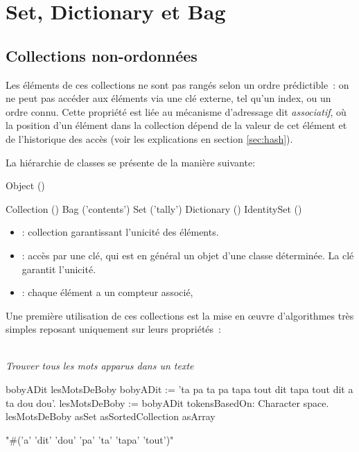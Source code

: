 \ifx\wholebook\relax\else


\fi

\chapter{Set, Dictionary et Bag}


\section{Collections non-ordonn\'ees}





Les \'el\'ements de ces collections ne sont pas rang\'es selon un
ordre pr\'edictible~:  on ne peut pas acc\'eder aux \'el\'ements
via une cl\'e externe, tel qu'un index, ou un ordre connu. 
Cette propri\'et\'e est li\'ee au m\'ecanisme
d'adressage dit {\sl associatif}, o\`u la position d'un \'el\'ement
dans la collection d\'epend de la valeur de cet \'el\'ement
et de l'historique des acc\`es
(voir les explications en section \ref{sec:hash}).

La hi\'erarchie de classes se pr\'esente de la mani\`ere suivante:

\begin{scode}
Object ()

    Collection ()
        Bag ('contents')
        Set ('tally')
            Dictionary ()
            IdentitySet ()

\end{scode}

\begin{itemize}
\item {} : collection garantissant l'unicit\'e des \'el\'ements.
\item {} : acc\`es par une cl\'e, 
qui est en g\'en\'eral un objet d'une classe d\'etermin\'ee.
La cl\'e garantit l'unicit\'e.
\item {} : chaque  \'el\'ement a un compteur associ\'e,
\end{itemize}

Une premi\`ere utilisation de ces collections est la 
mise en {\oe}uvre d'algorithmes tr\`es simples reposant uniquement sur leurs
propri\'et\'es~:
 
 ~\\{\em Trouver tous les mots apparus dans un texte} 
 \begin{scode} 
 
\stBar bobyADit lesMotsDeBoby \stBar
bobyADit := 'ta pa ta pa tapa tout dit tapa tout dit a ta dou dou'.
lesMotsDeBoby := bobyADit tokensBasedOn: Character space.
lesMotsDeBoby asSet asSortedCollection asArray

 "#('a' 'dit' 'dou' 'pa' 'ta' 'tapa' 'tout')"
\end{scode}

